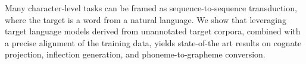 Many character-level tasks can be framed as sequence-to-sequence transduction, where the target is a word from a natural language. We show that leveraging target language models derived from unannotated target corpora, combined with a precise alignment of the training data, yields state-of-the art results on cognate projection, inflection generation, and phoneme-to-grapheme conversion.
